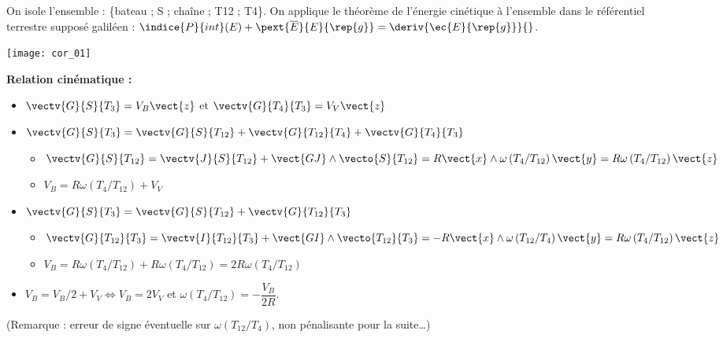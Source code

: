 \fi

\ifcolle
\else
{}

\ifprof
\begin{corrige}
On isole l'ensemble : \{bateau ; S ; chaîne ; T12 ; T4\}. On applique le théorème de l'énergie cinétique à l’ensemble dans le référentiel terrestre supposé galiléen : 
$\indice{P}{int}(E)+ \pext{\overline{E}}{E}{\rep{g}} = \deriv{\ec{E}{\rep{g}}}{}$.

\begin{center}
\texttt{[image: cor\_01]}
\end{center} 


\textbf{Relation cinématique :}


\begin{itemize}
	\item $\vectv{G}{S}{T_3}=V_B \vect{z}$ et $\vectv{G}{T_4}{T_{3}}=V_V \vect{z}$
	\item $\vectv{G}{S}{T_3}=\vectv{G}{S}{T_{12}}+\vectv{G}{T_{12}}{T_{4}}+\vectv{G}{T_4}{T_{3}}$
	\begin{itemize}
	\item $\vectv{G}{S}{T_{12}}=\vectv{J}{S}{T_{12}}+\vect{GJ}\wedge\vecto{S}{T_{12}}=R\vect{x}\wedge \omega\left({T_{4}}/{T_{12}}\right) \vect{y}=R\omega\left({T_{4}}/{T_{12}}\right) \vect{z}$
	\item $V_B=R\omega\left({T_{4}}/{T_{12}}\right)+V_V$
	\end{itemize}
	\item $\vectv{G}{S}{T_3}=\vectv{G}{S}{T_{12}}+\vectv{G}{T_{12}}{T_{3}}$
	\begin{itemize}
	\item $\vectv{G}{T_{12}}{T_{3}}=\vectv{I}{T_{12}}{T_{3}}+\vect{GI}\wedge\vecto{T_{12}}{T_{3}}=-R\vect{x}\wedge \omega\left({T_{12}}/{T_{4}}\right)\vect{y}=R\omega\left({T_{4}}/{T_{12}}\right) \vect{z}$
	\item $V_B=R\omega\left({T_{4}}/{T_{12}}\right)+R\omega\left({T_{4}}/{T_{12}}\right)=2R\omega\left({T_{4}}/{T_{12}}\right)$
\end{itemize}
\item $V_B=V_B/2+V_V\Longleftrightarrow V_B=2V_V$ et $\omega\left({T_{4}}/{T_{12}}\right)=-\dfrac{V_B}{2R}$.	 
\end{itemize}

(Remarque : erreur de signe éventuelle sur $\omega\left({T_{12}}/{T_{4}}\right)$, non pénalisante pour la suite…)



\end{corrige}
